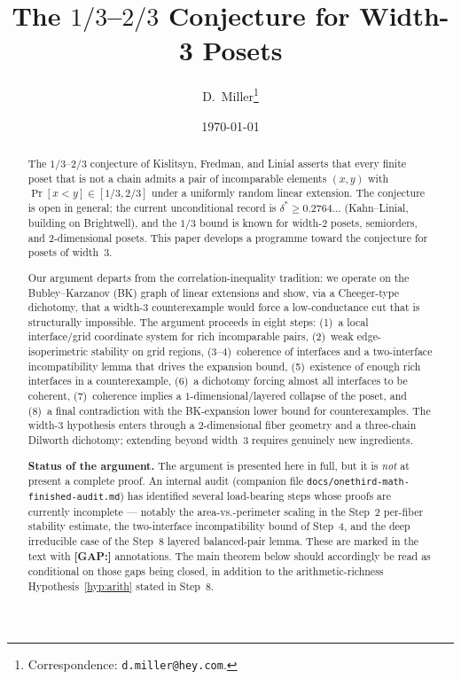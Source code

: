 \documentclass[11pt]{article}
\title{The $1/3$--$2/3$ Conjecture for Width-3 Posets}
\author{D.~Miller\thanks{Correspondence: \texttt{d.miller@hey.com}.}}
\date{\today}
\theoremstyle{definition}
\theoremstyle{remark}
\begin{document}
\maketitle

\begin{abstract}
The $1/3$--$2/3$ conjecture of Kislitsyn, Fredman, and Linial asserts
that every finite poset that is not a chain admits a pair of
incomparable elements $(x,y)$ with $\Pr[x<y]\in[1/3,2/3]$ under a
uniformly random linear extension.  The conjecture is open in
general; the current unconditional record is $\delta^*\ge
0.2764\ldots$ (Kahn--Linial, building on Brightwell), and the $1/3$
bound is known for width-$2$ posets, semiorders, and $2$-dimensional
posets.  This paper develops a programme toward the conjecture for
posets of width~$3$.

Our argument departs from the correlation-inequality tradition: we
operate on the Bubley--Karzanov (BK) graph of linear extensions and
show, via a Cheeger-type dichotomy, that a width-$3$ counterexample
would force a low-conductance cut that is structurally impossible.
The argument proceeds in eight steps: (1)~a local interface/grid
coordinate system for rich incomparable pairs, (2)~weak edge-isoperimetric
stability on grid regions, (3--4)~coherence of interfaces and a
two-interface incompatibility lemma that drives the expansion bound,
(5)~existence of enough rich interfaces in a counterexample,
(6)~a dichotomy forcing almost all interfaces to be coherent,
(7)~coherence implies a $1$-dimensional/layered collapse of the
poset, and (8)~a final contradiction with the BK-expansion lower
bound for counterexamples.  The width-$3$ hypothesis enters through
a $2$-dimensional fiber geometry and a three-chain Dilworth
dichotomy; extending beyond width~$3$ requires genuinely new
ingredients.

\medskip\noindent\textbf{Status of the argument.} The argument is
presented here in full, but it is \emph{not} at present a complete
proof. An internal audit (companion file
\texttt{docs/onethird-math-finished-audit.md}) has identified several
load-bearing steps whose proofs are currently incomplete --- notably
the area-vs.-perimeter scaling in the Step~2 per-fiber stability
estimate, the two-interface incompatibility bound of Step~4, and the
deep irreducible case of the Step~8 layered balanced-pair lemma. These
are marked in the text with \textbf{[GAP:]} annotations. The main
theorem below should accordingly be read as conditional on those gaps
being closed, in addition to the arithmetic-richness
Hypothesis~\ref{hyp:arith} stated in Step~8.
\end{abstract}
\end{document}
